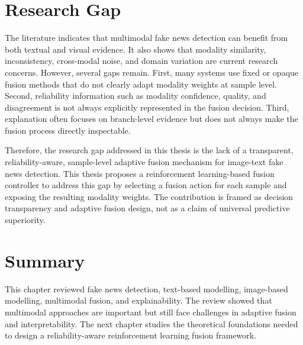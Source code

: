 \section{Research Gap}


The literature indicates that multimodal fake news detection can benefit from both textual and visual evidence. It also shows that modality similarity, inconsistency, cross-modal noise, and domain variation are current research concerns. However, several gaps remain. First, many systems use fixed or opaque fusion methods that do not clearly adapt modality weights at sample level. Second, reliability information such as modality confidence, quality, and disagreement is not always explicitly represented in the fusion decision. Third, explanation often focuses on branch-level evidence but does not always make the fusion process directly inspectable.


Therefore, the research gap addressed in this thesis is the lack of a transparent, reliability-aware, sample-level adaptive fusion mechanism for image-text fake news detection. This thesis proposes a reinforcement learning-based fusion controller to address this gap by selecting a fusion action for each sample and exposing the resulting modality weights. The contribution is framed as decision transparency and adaptive fusion design, not as a claim of universal predictive superiority.


\section{Summary}


This chapter reviewed fake news detection, text-based modelling, image-based modelling, multimodal fusion, and explainability. The review showed that multimodal approaches are important but still face challenges in adaptive fusion and interpretability. The next chapter studies the theoretical foundations needed to design a reliability-aware reinforcement learning fusion framework.

\clearpage
